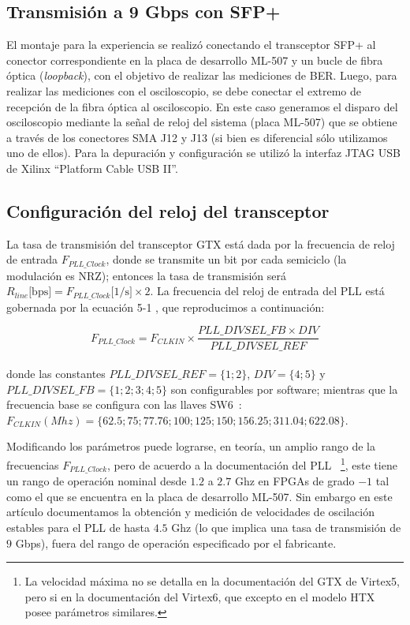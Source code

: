
\subsection{Transmisión a 9 Gbps con SFP+}
El montaje para la experiencia se realizó conectando el transceptor SFP+
al conector correspondiente en la placa de desarrollo ML-507 y un bucle de
fibra óptica ({\em loopback}), con el objetivo de realizar las
mediciones de BER. Luego, para realizar las mediciones con el
osciloscopio, se debe conectar el extremo de recepción de la fibra
óptica al osciloscopio. En este caso generamos el disparo del
osciloscopio mediante la señal de reloj del sistema (placa ML-507) que
se obtiene a través de los conectores SMA J12 y J13 (si bien es
diferencial sólo utilizamos uno de ellos).  Para la depuración y
configuración se utilizó la interfaz JTAG USB de Xilinx ``Platform Cable
USB II''.
\subsection{Configuración del reloj del transceptor}

La tasa de transmisión del transceptor GTX está dada por la
frecuencia de reloj de entrada $F_{PLL\_Clock}$, donde se transmite un
bit por cada semiciclo (la modulación es NRZ); entonces la tasa de
transmisión será
$R_{line}\mbox{[bps]}=F_{PLL\_Clock}\mbox{[1/s]} \times 2$.  La
frecuencia del reloj de entrada del PLL está gobernada por la ecuación
5-1 \cite[Pag. 88]{ug198}, que reproducimos a continuación:

\begin{equation}
F_{PLL\_Clock} = F_{CLKIN} \times \frac{PLL\_DIVSEL\_FB \times
DIV}{PLL\_DIVSEL\_REF}%
\end{equation}\\

donde las constantes $PLL\_DIVSEL\_REF = \{1;2\}$, $DIV = \{4;5\} $ y
$PLL\_DIVSEL\_FB = \{1;2;3;4;5\}$ son configurables por software;
mientras que la frecuencia base se configura con las llaves
SW6~\cite[Tabla 1-32]{ug347}: $
F_{CLKIN} (Mhz)= \{62.5;75;77.76;100;125;150;156.25;311.04;622.08\}$.


 Modificando los parámetros puede lograrse, en teoría, un amplio rango
de la frecuencias $F_{PLL\_Clock}$, pero de acuerdo a la documentación
del PLL \cite[Pág. 71]{ug366}~\footnote{La velocidad máxima no se
detalla en la documentación del GTX de Virtex5, pero si en la
documentación del Virtex6, que excepto en el modelo HTX posee parámetros
similares.}, este tiene un rango de operación nominal desde $1.2$ a
$2.7$ Ghz en FPGAs de grado $-1$ tal como el que se encuentra en la
placa de desarrollo ML-507. Sin embargo en este artículo documentamos la
obtención y medición de velocidades de oscilación estables para el PLL
de hasta $4.5$ Ghz (lo que implica una tasa de transmisión de $9$ Gbps),
fuera del rango de operación especificado por el fabricante.

